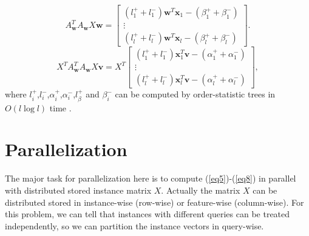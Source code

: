 \documentclass[11pt, oneside]{article}   	%
\def\bx{{\boldsymbol x}}
\def\bv{{\boldsymbol v}}
\def\bw{{\boldsymbol w}}
\def\bv{{\boldsymbol v}}
\begin{document}
\begin{equation}\label{eq7}
	A_\bw^TA_\bw X\bw =  
	\left[\begin{array}{c}
	(l_{1}^++l_{1}^-)\bw^T\bx_{1}-(\beta_{1}^++\beta_{1}^-) \\
	\vdots \\
	(l_{l}^++l_{l}^-)\bw^T\bx_{l}-(\beta_{l}^++\beta_{l}^-)
	\end{array}\right].
\end{equation}
\begin{equation}\label{eq8}
	X^TA_\bw^TA_\bw X\bv = X^T 
	\left[\begin{array}{c}
	(l_{1}^++l_{1}^-)\bx_{1}^T\bv-(\alpha_{1}^++\alpha_{1}^-) \\
	\vdots \\
	(l_{l}^++l_{l}^-)\bx_{l}^T\bv-(\alpha_{l}^++\alpha_{l}^-)
	\end{array}\right],
\end{equation}
where $l_i^+$,$l_i^-$,$\alpha_i^+$,$\alpha_i^-$,$l_\beta^+$ and $\beta_i^-$ can be computed by order-statistic trees in $O(l\log l)$ time \citep{AA11b,CPL13a}.
\section{Parallelization}
The major task for parallelization here is to compute (\ref{eq5})-(\ref{eq8}) in parallel with distributed stored instance matrix $X$. Actually the matrix $X$ can be distributed stored in instance-wise  (row-wise) or feature-wise (column-wise). For this problem, we can tell that instances with different queries can be treated independently, so we can partition the instance vectors in query-wise.
\end{document}
